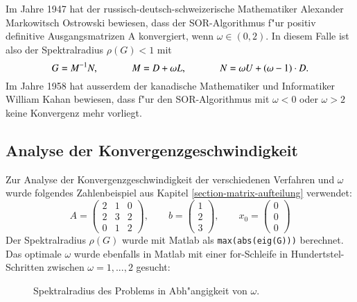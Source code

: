 \begin{refsection}
Im Jahre 1947 hat der russisch-deutsch-schweizerische Mathematiker
Alexander Markowitsch Ostrowski \cite{AlexanderMarkowitschOstrowski}
bewiesen, dass der SOR-Algorithmus f"ur positiv definitive
Ausgangsmatrizen A konvergiert, wenn $\omega \in (0,2)$. In diesem Falle
ist also der Spektralradius $\rho(G) < 1$ mit
\begin{equation} \label{Spektralradius}
G=M^{-1}N,\hspace{.1\textwidth}
M=D+\omega L,\hspace{.1\textwidth}
N=\omega U+(\omega-1)\cdot D.
\end{equation}
Im Jahre 1958 hat ausserdem der kanadische Mathematiker und Informatiker
William Kahan \cite{WilliamKahan} bewiesen, dass f"ur den SOR-Algorithmus
mit $\omega < 0$ oder $\omega > 2$ keine Konvergenz mehr vorliegt.
			
\subsection{Analyse der Konvergenzgeschwindigkeit \label{subsec:
Konv.geschw.analyse}}
Zur Analyse der Konvergenzgeschwindigkeit der verschiedenen
Verfahren und $\omega$ wurde folgendes Zahlenbeispiel aus Kapitel
\ref{section-matrix-aufteilung} verwendet:
\begin{equation} \label{G.-S.-Ex.}
A=
\begin{pmatrix}
	2 & 1 & 0 \\
	2 & 3 & 2 \\
	0 & 1 & 2
\end{pmatrix},
			\qquad
b=
\begin{pmatrix}
	1 \\
	2 \\
	3
	\end{pmatrix},
\qquad
x_0=
\begin{pmatrix}
	0 \\
	0 \\
	0
\end{pmatrix}
\end{equation}
Der Spektralradius $\rho(G)$ wurde mit Matlab als
\texttt{max(abs(eig(G)))} berechnet. Das optimale $\omega$ wurde
ebenfalls in Matlab mit einer for-Schleife in Hundertstel-Schritten
zwischen $\omega=1, ..., 2$ gesucht:
\begin{figure}[!ht]\centering
\caption{Spektralradius des Problems in Abh"angigkeit von $\omega$.}
\label{fig:Spekt.rad.vs.omega}
\end{figure}


\end{refsection}
